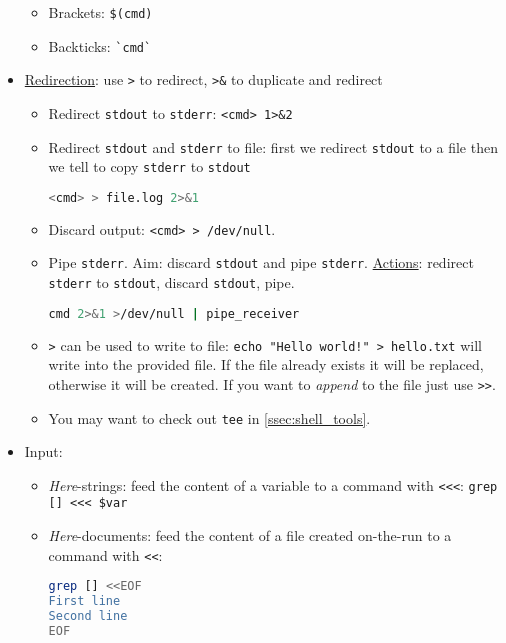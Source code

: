 \documentclass[a4paper,12pt,%
              final%
              ]{article}
\begin{document}
\begin{itemize}
    \begin{itemize}
      \item Brackets: \verb|$(cmd)|
      \item Backticks: \verb|`cmd`|
    \end{itemize}
  \item \href{https://www.gnu.org/software/bash/manual/bash.html#Redirections}{Redirection}: use \verb|>| to redirect, \verb|>&| to duplicate and redirect
    \begin{itemize}
      \item Redirect \texttt{stdout} to \texttt{stderr}: \verb|<cmd> 1>&2|
      \item Redirect \texttt{stdout} and \texttt{stderr} to file: first we redirect \texttt{stdout} to a file then we tell to copy \texttt{stderr} to \texttt{stdout}
\begin{lstlisting}[language=bash]
<cmd> > file.log 2>&1
\end{lstlisting}
      \item Discard output: \texttt{<cmd> > /dev/null}.
      \item Pipe \texttt{stderr}. Aim: discard \texttt{stdout} and pipe \texttt{stderr}. \href{https://stackoverflow.com/questions/2342826/how-can-i-pipe-stderr-and-not-stdout}{Actions}: redirect \texttt{stderr} to \texttt{stdout}, discard \texttt{stdout}, pipe.
\begin{lstlisting}[language=bash]
cmd 2>&1 >/dev/null | pipe_receiver
\end{lstlisting}
      \item \verb|>| can be used to write to file: \verb|echo "Hello world!" > hello.txt| will write into the provided file. If the file already exists it will be replaced, otherwise it will be created. If you want to \emph{append} to the file just use \verb|>>|.
      \item You may want to check out \texttt{tee} in \ref{ssec:shell_tools}.
    \end{itemize}
  \item Input:
    \begin{itemize}
      \item \emph{Here}-strings: feed the content of a variable to a command with \verb|<<<|: \verb|grep [] <<< $var|
      \item \emph{Here}-documents: feed the content of a file created on-the-run to a command with  \verb|<<|:
\begin{lstlisting}[language=bash]
grep [] <<EOF
First line
Second line
EOF
\end{lstlisting}

\end{itemize}
\end{itemize}
\end{document}
